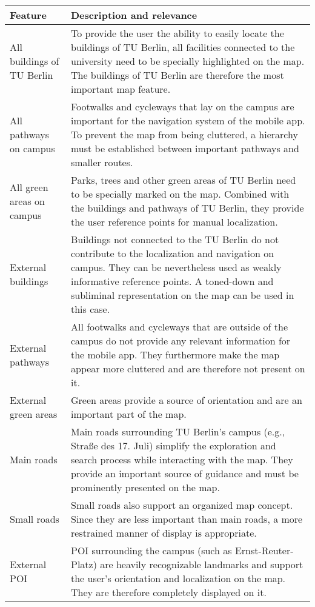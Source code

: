 \begin{longtable}{|p{1.0in}|p{5.0in}|}
    \hline
    Feature & Description and relevance \\
    \hline
    All buildings of TU Berlin & To provide the user the ability to easily locate the buildings of TU Berlin, all facilities connected to the university need to be specially highlighted on the map. The buildings of TU Berlin are therefore the most important map feature.\\
    \hline
    All pathways on campus & Footwalks and cycleways that lay on the campus are important for the navigation system of the mobile app. To prevent the map from being cluttered, a hierarchy must be established between important pathways and smaller routes. \\
    \hline
    All green areas on campus & Parks, trees and other green areas of TU Berlin need to be specially marked on the map. Combined with the buildings and pathways of TU Berlin, they provide the user reference points for manual localization. \\
    \hline
    External buildings & Buildings not connected to the TU Berlin do not contribute to the localization and navigation on campus. They can be nevertheless used as weakly informative reference points. A toned-down and subliminal representation on the map can be used in this case. \\
    \hline
    External pathways & All footwalks and cycleways that are outside of the campus do not provide any relevant information for the mobile app. They furthermore make the map appear more cluttered and are therefore not present on it. \\
    \hline
    External green areas & Green areas provide a source of orientation and are an important part of the map. \\
    \hline
    Main roads & Main roads surrounding TU Berlin's campus (e.g., Straße des 17. Juli) simplify the exploration and search process while interacting with the map. They provide an important source of guidance and must be prominently presented on the map. \\
    \hline
    Small roads & Small roads also support an organized map concept. Since they are less important than main roads, a more restrained manner of display is appropriate. \\
    \hline
    External POI & POI surrounding the campus (such as Ernst-Reuter-Platz) are heavily recognizable landmarks and support the user's orientation and localization on the map. They are therefore completely displayed on it. \\
    \hline
\end{longtable}

